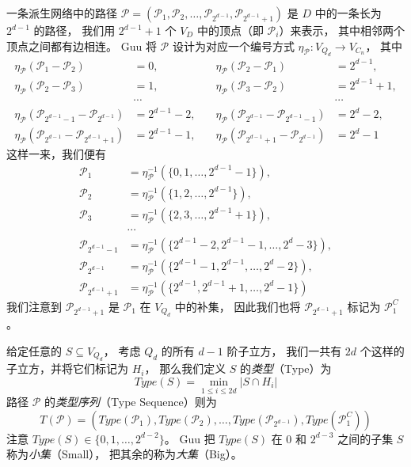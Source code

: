 一条派生网络中的路径
$\mathcal{P} = (\mathcal{P}_1, \mathcal{P}_2, \dots, \mathcal{P}_{2^{d - 1}}, \mathcal{P}_{2^{d - 1} + 1})$
是 $D$ 中的一条长为 $2^{d - 1}$ 的路径，
我们用 $2^{d - 1} + 1$ 个 $V_D$ 中的顶点（即 $\mathcal{P}_i$）来表示，
其中相邻两个顶点之间都有边相连。
Guu 将 $\mathcal{P}$ 设计为对应一个编号方式 $\eta_\mathcal{P} \colon V_{Q_d} \rightarrow V_{C_n}$，
其中
\begin{align*}
\eta_\mathcal{P}(\mathcal{P}_1 - \mathcal{P}_2) & = 0, & \quad
\eta_\mathcal{P}(\mathcal{P}_2 - \mathcal{P}_1) & = 2^{d - 1}, \\
\eta_\mathcal{P}(\mathcal{P}_2 - \mathcal{P}_3) & = 1, & \quad
\eta_\mathcal{P}(\mathcal{P}_3 - \mathcal{P}_2) & = 2^{d - 1} + 1, \\
						& \cdots & \quad & \cdots \\
\eta_\mathcal{P}(\mathcal{P}_{2^{d - 1} - 1} - \mathcal{P}_{2^{d - 1}}) & = 2^{d - 1} - 2, & \quad
\eta_\mathcal{P}(\mathcal{P}_{2^{d - 1}} - \mathcal{P}_{2^{d - 1} - 1}) & = 2^d - 2, \\
\eta_\mathcal{P}(\mathcal{P}_{2^{d - 1}} - \mathcal{P}_{2^{d - 1} + 1}) & = 2^{d - 1} - 1, & \quad
\eta_\mathcal{P}(\mathcal{P}_{2^{d - 1} + 1} - \mathcal{P}_{2^{d - 1}}) & = 2^d - 1
\end{align*}
这样一来，我们便有
\begin{align*}
	      \mathcal{P}_1 & = \eta_\mathcal{P}^{-1}(\{0, 1, \dots, 2^{d - 1} - 1\}), \\
	      \mathcal{P}_2 & = \eta_\mathcal{P}^{-1}(\{1, 2, \dots, 2^{d - 1}\}), \\
	      \mathcal{P}_3 & = \eta_\mathcal{P}^{-1}(\{2, 3, \dots, 2^{d - 1} + 1\}), \\
			    & \cdots \\
\mathcal{P}_{2^{d - 1} - 1} & = \eta_\mathcal{P}^{-1}(\{2^{d - 1} - 2, 2^{d - 1} - 1, \dots, 2^d - 3\}), \\
    \mathcal{P}_{2^{d - 1}} & = \eta_\mathcal{P}^{-1}(\{2^{d - 1} - 1, 2^{d - 1}, \dots, 2^d - 2\}), \\
\mathcal{P}_{2^{d - 1} + 1} & = \eta_\mathcal{P}^{-1}(\{2^{d - 1}, 2^{d - 1} + 1, \dots, 2^d - 1\})
\end{align*}
我们注意到 $\mathcal{P}_{2^{d - 1} + 1}$ 是 $\mathcal{P}_1$ 在 $V_{Q_d}$ 中的补集，
因此我们也将 $\mathcal{P}_{2^{d - 1} + 1}$ 标记为 $\mathcal{P}_1^C$。

给定任意的 $S \subseteq V_{Q_d}$，
考虑 $Q_d$ 的所有 $d - 1$ 阶子立方，
我们一共有 $2 d$ 个这样的子立方，并将它们标记为 $H_i$，
那么我们定义 $S$ 的\emph{类型}（Type）为
\begin{equation*}
Type(S) = \min_{1 \le i \le 2 d} |S \cap H_i|
\end{equation*}
路径 $\mathcal{P}$ 的\emph{类型序列}（Type Sequence）则为
\begin{equation*}
T(\mathcal{P}) = \left(Type(\mathcal{P}_1), Type(\mathcal{P}_2), \dots, Type(\mathcal{P}_{2^{d - 1}}), Type(\mathcal{P}_1^C)\right)
\end{equation*}
注意 $Type(S) \in \{0, 1, \dots, 2^{d - 2}\}$。
Guu 把 $Type(S)$ 在 $0$ 和 $2^{d - 3}$ 之间的子集 $S$ 称为\emph{小集}（Small），
把其余的称为\emph{大集}（Big）。

